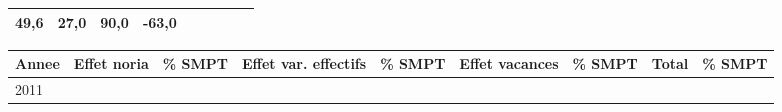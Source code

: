 \begin{longtable}[]{@{}lllllllll@{}}
\begin{minipage}[t]{0.10\columnwidth}
49,6\strut
\end{minipage} & \begin{minipage}[t]{0.07\columnwidth}\raggedright
27,0\strut
\end{minipage} & \begin{minipage}[t]{0.07\columnwidth}\raggedright
90,0\strut
\end{minipage} & \begin{minipage}[t]{0.11\columnwidth}\raggedright
-63,0\strut
\end{minipage} & \begin{minipage}[t]{0.14\columnwidth}\raggedright
\strut
\end{minipage}\tabularnewline
\bottomrule
\end{longtable}

\begin{longtable}[]{@{}lllllllll@{}}
\toprule
\begin{minipage}[b]{0.05\columnwidth}\raggedright
Annee\strut
\end{minipage} & \begin{minipage}[b]{0.10\columnwidth}\raggedright
Effet noria\strut
\end{minipage} & \begin{minipage}[b]{0.06\columnwidth}\raggedright
\% SMPT\strut
\end{minipage} & \begin{minipage}[b]{0.16\columnwidth}\raggedright
Effet var. effectifs\strut
\end{minipage} & \begin{minipage}[b]{0.06\columnwidth}\raggedright
\% SMPT\strut
\end{minipage} & \begin{minipage}[b]{0.12\columnwidth}\raggedright
Effet vacances\strut
\end{minipage} & \begin{minipage}[b]{0.06\columnwidth}\raggedright
\% SMPT\strut
\end{minipage} & \begin{minipage}[b]{0.10\columnwidth}\raggedright
Total\strut
\end{minipage} & \begin{minipage}[b]{0.06\columnwidth}\raggedright
\% SMPT\strut
\end{minipage}\tabularnewline
\midrule
\endhead
\begin{minipage}[t]{0.05\columnwidth}\raggedright
2011\strut
\end{minipage} & \begin{minipage}[t]{0.10\columnwidth}\raggedright

\end{minipage}
\end{longtable}
